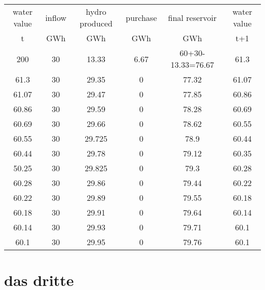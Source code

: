 \documentclass{article}
\begin{document}
\begin{center}
\begin{tabular}{|c|c|c|c|c|c|}
\hline
water value & inflow & hydro produced & purchase & final reservoir	& water value\\
    t       &  GWh   &    GWh         &     GWh       &     GWh         & t+1 \\
\hline
\hline
200 & 30 & 13.33 & 6.67 & 60+30-13.33=76.67 & 61.3\\
61.3 & 30 & 29.35 & 0 & 77.32 & 61.07\\
61.07 & 30 & 29.47 & 0 & 77.85 & 60.86\\
60.86 & 30 & 29.59 & 0 & 78.28 & 60.69\\
60.69 & 30 & 29.66 & 0 & 78.62 & 60.55\\
60.55 & 30 & 29.725 & 0 & 78.9 & 60.44\\
60.44 & 30 & 29.78 & 0 & 79.12 & 60.35\\
50.25 & 30 & 29.825 & 0 & 79.3 & 60.28\\
60.28 & 30 & 29.86 & 0 & 79.44 & 60.22\\
60.22 & 30 & 29.89 & 0 & 79.55 & 60.18\\
60.18 & 30 & 29.91 & 0 & 79.64 & 60.14\\
60.14 & 30 & 29.93 & 0 & 79.71 & 60.1\\
\hline
60.1 & 30 & 29.95 & 0 & 79.76 & 60.1\\
\hline
\end{tabular}
\end{center}


\section{das dritte}
\end{document}
